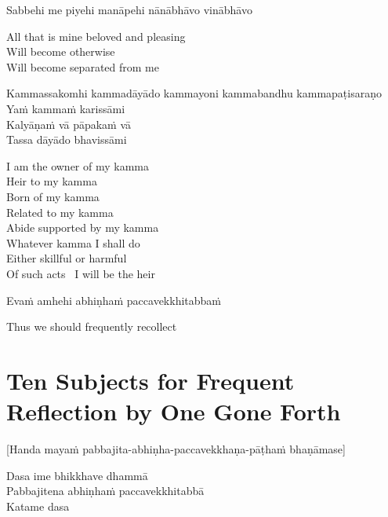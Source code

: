 Sabbehi me piyehi manāpehi nānābhāvo vinābhāvo

\begin{english}
  All that is mine beloved and pleasing\\
  Will become otherwise\\
  Will become separated from me
\end{english}

Kammassakomhi kammadāyādo kammayoni kammabandhu kammapaṭisaraṇo\\
Yaṁ kammaṁ karissāmi\\
Kalyāṇaṁ vā pāpakaṁ vā\\
Tassa dāyādo bhavissāmi

\begin{english}
  I am the owner of my kamma\\
  Heir to my kamma\\
  Born of my kamma\\
  Related to my kamma\\
  Abide supported by my kamma\\
  Whatever kamma I shall do\\
  Either skillful or harmful\\
  Of such acts \breathmark\ I will be the heir
\end{english}

Evaṁ amhehi abhiṇhaṁ paccavekkhitabbaṁ

\begin{english}
  Thus we should frequently recollect
\end{english}

\suttaRef{[AN 5.57]}

\clearpage

\section[Ten Subjects for Frequent Reflection by One Gone Forth]{Ten Subjects for Frequent Reflection by One Gone Forth}
\label{ten-recollections}

\begin{center}
  [Handa mayaṁ pabbajita-abhiṇha-paccavekkhaṇa-pāṭhaṁ bhaṇāmase]
\end{center}

Dasa ime bhikkhave dhammā\\
Pabbajitena abhiṇhaṁ paccavekkhitabbā\\
Katame dasa

